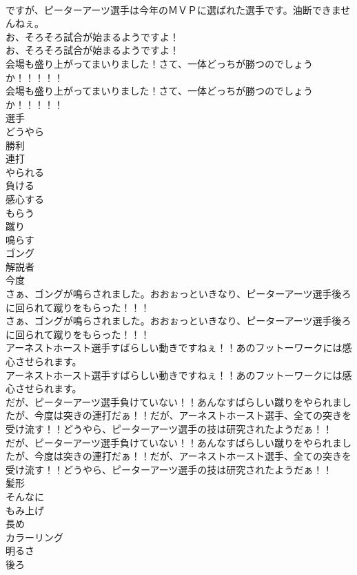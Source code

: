 \documentclass[8pt]{extreport}
\begin{document}
\begin{CJK}{UTF8}{min}
\\	ですが、ピーターアーツ選手は今年のＭＶＰに選ばれた選手です。油断できませんねぇ。 
\\	お、そろそろ試合が始まるようですよ！	
\\	お、そろそろ試合が始まるようですよ！ 
\\	会場も盛り上がってまいりました！さて、一体どっちが勝つのでしょうか！！！！！	
\\	会場も盛り上がってまいりました！さて、一体どっちが勝つのでしょうか！！！！！ 
\\	選手
\\	どうやら
\\	勝利
\\	連打
\\	やられる
\\	負ける
\\	感心する
\\	もらう
\\	蹴り
\\	鳴らす
\\	ゴング
\\	解説者
\\	今度
\\	さぁ、ゴングが鳴らされました。おおぉっといきなり、ピーターアーツ選手後ろに回られて蹴りをもらった！！！	
\\	さぁ、ゴングが鳴らされました。おおぉっといきなり、ピーターアーツ選手後ろに回られて蹴りをもらった！！！ 
\\	アーネストホースト選手すばらしい動きですねぇ！！あのフットーワークには感心させられます。	
\\	アーネストホースト選手すばらしい動きですねぇ！！あのフットーワークには感心させられます。 
\\	だが、ピーターアーツ選手負けていない！！あんなすばらしい蹴りをやられましたが、今度は突きの連打だぁ！！だが、アーネストホースト選手、全ての突きを受け流す！！どうやら、ピーターアーツ選手の技は研究されたようだぁ！！	
\\	だが、ピーターアーツ選手負けていない！！あんなすばらしい蹴りをやられましたが、今度は突きの連打だぁ！！だが、アーネストホースト選手、全ての突きを受け流す！！どうやら、ピーターアーツ選手の技は研究されたようだぁ！！ 
\\	髪形
\\	そんなに
\\	もみ上げ
\\	長め
\\	カラーリング
\\	明るさ
\\	後ろ

\end{CJK}
\end{document}
